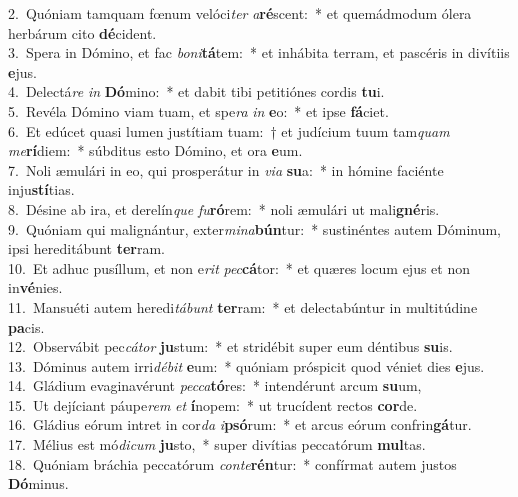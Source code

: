{2.~}Quóniam tamquam fœnum velóci\textit{ter} \textit{a}\textbf{ré}scent:~* et quemádmodum ólera herbárum cito \textbf{dé}cident.\\
{3.~}Spera in Dómino, et fac \textit{bo}\textit{ni}\textbf{tá}tem:~* et inhábita terram, et pascéris in divítiis \textbf{e}jus.\\
{4.~}Delectá\textit{re} \textit{in} \textbf{Dó}mino:~* et dabit tibi petitiónes cordis \textbf{tu}i.\\
{5.~}Revéla Dómino viam tuam, et spe\textit{ra} \textit{in} \textbf{e}o:~* et ipse \textbf{fá}ciet.\\
{6.~}Et edúcet quasi lumen justítiam tuam:~† et judícium tuum tam\textit{quam} \textit{me}\textbf{rí}diem:~* súbditus esto Dómino, et ora \textbf{e}um.\\
{7.~}Noli æmulári in eo, qui prosperátur in \textit{vi}\textit{a} \textbf{su}a:~* in hómine faciénte inju\textbf{stí}tias.\\
{8.~}Désine ab ira, et derelín\textit{que} \textit{fu}\textbf{ró}rem:~* noli æmulári ut mali\textbf{gné}ris.\\
{9.~}Quóniam qui malignántur, exter\textit{mi}\textit{na}\textbf{bún}tur:~* sustinéntes autem Dóminum, ipsi hereditábunt \textbf{ter}ram.\\
{10.~}Et adhuc pusíllum, et non e\textit{rit} \textit{pec}\textbf{cá}tor:~* et quæres locum ejus et non in\textbf{vé}nies.\\
{11.~}Mansuéti autem heredi\textit{tá}\textit{bunt} \textbf{ter}ram:~* et delectabúntur in multitúdine \textbf{pa}cis.\\
{12.~}Observábit pec\textit{cá}\textit{tor} \textbf{ju}stum:~* et stridébit super eum déntibus \textbf{su}is.\\
{13.~}Dóminus autem irri\textit{dé}\textit{bit} \textbf{e}um:~* quóniam próspicit quod véniet dies \textbf{e}jus.\\
{14.~}Gládium evaginavérunt \textit{pec}\textit{ca}\textbf{tó}res:~* intendérunt arcum \textbf{su}um,\\
{15.~}Ut dejíciant páupe\textit{rem} \textit{et} \textbf{í}nopem:~* ut trucídent rectos \textbf{cor}de.\\
{16.~}Gládius eórum intret in cor\textit{da} \textit{i}\textbf{psó}rum:~* et arcus eórum confrin\textbf{gá}tur.\\
{17.~}Mélius est mó\textit{di}\textit{cum} \textbf{ju}sto,~* super divítias peccatórum \textbf{mul}tas.\\
{18.~}Quóniam bráchia peccatórum \textit{con}\textit{te}\textbf{rén}tur:~* confírmat autem justos \textbf{Dó}minus.\\
